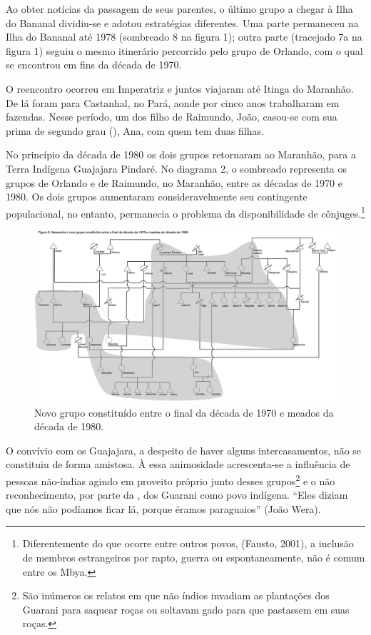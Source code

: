 {{Ao obter notícias da passagem de seus parentes, o último grupo a chegar
à Ilha do Bananal dividiu-se e adotou estratégias diferentes. Uma parte
permaneceu na Ilha do Bananal até 1978 (sombreado 8 na figura 1); outra
parte (tracejado 7a na figura 1) seguiu o mesmo itinerário percorrido
pelo grupo de Orlando, com o qual se encontrou em fins da década de
1970.

O reencontro ocorreu em Imperatriz e juntos viajaram até Itinga do
Maranhão. De lá foram para Castanhal, no Pará, aonde por cinco anos
trabalharam em fazendas. Nesse período, um dos filho de Raimundo, João,
casou-se com sua prima de segundo grau (), Ana, com quem tem duas
filhas.

No princípio da década de 1980 os dois grupos retornaram ao Maranhão,
para a Terra Indígena Guajajara Pindaré. No diagrama 2, o sombreado
representa os grupos de Orlando e de Raimundo, no Maranhão, entre as
décadas de 1970 e 1980. Os dois grupos aumentaram consideravelmente seu
contingente populacional, no entanto, permanecia o problema da
disponibilidade de cônjuges.\footnote{Diferentemente do que ocorre
entre outros povos, (Fausto, 2001), a inclusão de membros estrangeiros
por rapto, guerra ou espontaneamente, não é comum entre os Mbya.}

\begin{figure}
  \centering
 \includegraphics[width=\textwidth]{./img/GUARANIS-img10.png}	
  \hfill
  \caption{Novo grupo constituído entre o final da década de 1970 e meados da década de 1980.}
\end{figure}
 
 

O convívio com os Guajajara, a despeito de haver alguns intercasamentos,
não se constituiu de forma amistosa. À essa animosidade acrescenta-se a
influência de pessoas não-índias agindo em proveito próprio junto
desses grupos\footnote{São inúmeros os relatos em que não índios
invadiam as plantações dos Guarani para saquear roças ou soltavam gado
para que pastassem em suas roças.} e o não reconhecimento, por parte da
, dos Guarani como povo indígena. ``Eles diziam que nós não
podíamos ficar lá, porque éramos paraguaios'' (João Wera). 

}}
